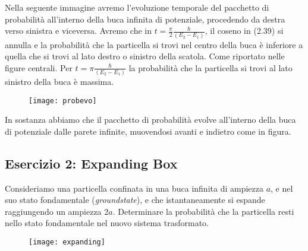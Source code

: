 Nella seguente immagine avremo l'evoluzione temporale del pacchetto di probabilit\`a all'interno della buca infinita di potenziale, procedendo da destra verso sinistra e viceversa. Avremo che in $t = \frac{\pi}{2} \frac{\hbar}{(E_2 - E_1)}$, il coseno in (2.39)  si annulla e la probabilit\`a che la particella si trovi nel centro della buca \`e inferiore a quella che si trovi al lato destro o sinistro della scatola. Come riportato nelle figure centrali. Per $t = \pi \frac{\hbar}{(E_2 -E_1)}$ la probabilit\`a che la particella si trovi al lato sinistro della buca \`e massima.
\begin{figure}[!ht]
\vspace{0.1in}
\texttt{[image: probevo]}	
\centering
\vspace{0.1in}
\end{figure}

In sostanza abbiamo che il pacchetto di probabilit\`a evolve all'interno della buca di potenziale dalle parete infinite, muovendosi avanti e indietro come in figura.

\newpage

\subsection{Esercizio 2: Expanding Box}

Consideriamo una particella confinata in una buca infinita di ampiezza $a$, e nel suo stato fondamentale (\textit{groundstate}), e che istantaneamente si espande raggiungendo un ampiezza $2a$. Determinare la probabilit\`a che la particella resti nello stato fondamentale nel nuovo sistema trasformato.
\begin{figure}[!ht]
\vspace{0.1in}
\texttt{[image: expanding]}	
\centering
\end{figure}

